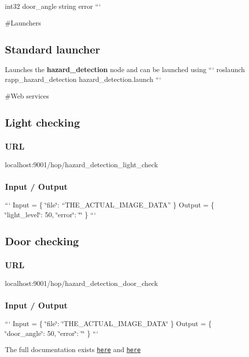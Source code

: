 int32 door\-\_\-angle string error ```

\#\-Launchers

\subsection*{Standard launcher}

Launches the {\bfseries hazard\-\_\-detection} node and can be launched using ``` roslaunch rapp\-\_\-hazard\-\_\-detection hazard\-\_\-detection.\-launch ```

\#\-Web services

\subsection*{Light checking}

\subsubsection*{U\-R\-L}

{\ttfamily localhost\-:9001/hop/hazard\-\_\-detection\-\_\-light\-\_\-check}

\subsubsection*{Input / Output}

``` Input = \{ \char`\"{}file\char`\"{}\-: “\-T\-H\-E\-\_\-\-A\-C\-T\-U\-A\-L\-\_\-\-I\-M\-A\-G\-E\-\_\-\-D\-A\-T\-A” \} {\ttfamily  } Output = \{ \char`\"{}light\-\_\-level\char`\"{}\-: 50, \char`\"{}error\char`\"{}\-: \char`\"{}\char`\"{} \} ```

\subsection*{Door checking}

\subsubsection*{U\-R\-L}

{\ttfamily localhost\-:9001/hop/hazard\-\_\-detection\-\_\-door\-\_\-check}

\subsubsection*{Input / Output}

``` Input = \{ \char`\"{}file\char`\"{}\-: \char`\"{}\-T\-H\-E\-\_\-\-A\-C\-T\-U\-A\-L\-\_\-\-I\-M\-A\-G\-E\-\_\-\-D\-A\-T\-A\char`\"{} \} {\ttfamily  } Output = \{ \char`\"{}door\-\_\-angle\char`\"{}\-: 50, \char`\"{}error\char`\"{}\-: \char`\"{}\char`\"{} \} ```

The full documentation exists \href{https://github.com/rapp-project/rapp-platform/tree/master/rapp_web_services/services#hazard-detection-door-check}{\tt here} and \href{https://github.com/rapp-project/rapp-platform/tree/master/rapp_web_services/services#hazard-detection-door-check}{\tt here} 